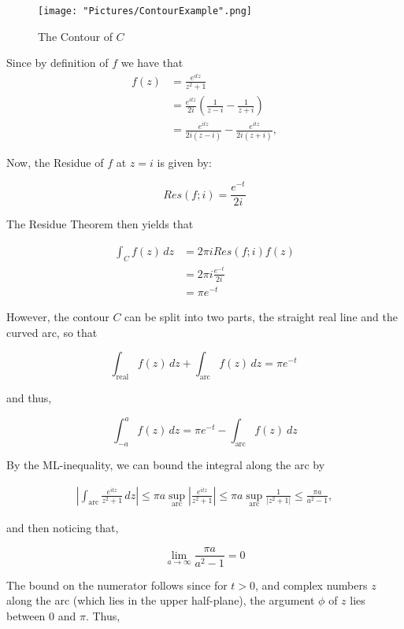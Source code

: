\documentclass[12pt, letterpaper]{article}
\begin{document}
\begin{figure}[h]
    \centering
    \texttt{[image: "Pictures/ContourExample".png]}
    \caption{The Contour of \( C\)}
    \label{fig:my_label5}
\end{figure}

\noindent
Since by definition of \(f\) we have that 
\begin{align*}
f(z) &= \frac{e^{itz}}{z^2+1} \\
&=\frac{e^{itz}}{2i}\left(\frac{1}{z-i}-\frac{1}{z+i}\right) \\
&=\frac{e^{itz}}{2i(z-i)} -\frac{e^{itz}}{2i(z+i)} ,
\end{align*}

\noindent
Now, the Residue of \(f\) at \( z=i\) is given by:

\[Res(f; i) =\frac{e^{-t}}{2i}\]

\noindent
The Residue Theorem then yields that 

\begin{align*}
\int_C f(z)\,dz &= 2\pi iRes(f; i) f(z) \\
&=2\pi i \frac{e^{-t}}{2i} \\
&= \pi e^{-t} 
\end{align*}

\noindent
However, the contour \(C\) can be split into two parts, the straight real line and the curved arc, so that

\[\int_{\mathrm{real}} f(z)\,dz+\int_{\mathrm{arc}} f(z)\,dz=\pi e^{-t}\ \]

\noindent
and thus,

\[\int_{-a}^a f(z)\,dz =\pi e^{-t}-\int_{\mathrm{arc}} f(z)\ dz \]

\noindent
By the ML-inequality, we can bound the integral along the arc by 

\begin{align*}
\left|\int_{\mathrm{arc}}\frac{e^{itz}}{z^2+1}\,dz\right| \leq \pi a  \sup_{\text{arc}} \left| \frac{e^{itz}}{z^2+1} \right| \leq \pi a \sup_{\text{arc}} \frac{1}{|z^2+1|} \leq \frac{\pi a}{a^2 - 1},
\end{align*}

\noindent
and then noticing that, 
 
\[ \lim_{a \to \infty} \frac{\pi a}{a^2-1} = 0 \]

\noindent
The bound on the numerator follows since for \(t > 0\), and complex numbers \(z\) along the arc (which lies in the upper half-plane), the argument \( \phi \) of \( z \) lies between 0 and \(\pi \).  Thus,
\end{document}
